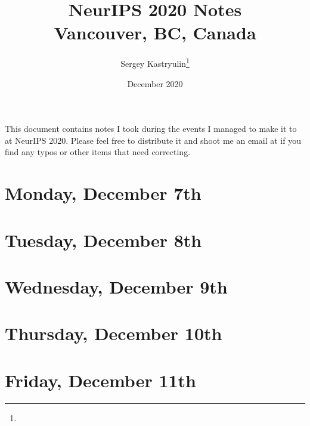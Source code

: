 \documentclass[11pt]{article}
\title{NeurIPS 2020 Notes \\ \Large{Vancouver, BC, Canada}}
\author{Sergey Kastryulin\footnote{\durl{https://github.com/snk4tr}} \\ \durl{snk4tr@gmail.com}}
\date{December 2020}
\begin{document}
\maketitle
\tableofcontents
\newpage


This document contains notes I took during the events I managed to make it to at NeurIPS 2020. Please feel free to distribute it and shoot me an email at  if you find any typos or other items that need correcting. \\




\newpage
\section{Monday, December 7th}


\newpage
\section{Tuesday, December 8th}


\newpage
\section{Wednesday, December 9th}


\newpage
\section{Thursday, December 10th}


\newpage
\section{Friday, December 11th}


\newpage
\end{document}
